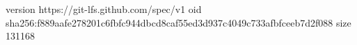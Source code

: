 version https://git-lfs.github.com/spec/v1
oid sha256:f889aafe278201c6fbfc944dbcd8caf55ed3d937c4049c733afbfceeb7d2f088
size 131168
